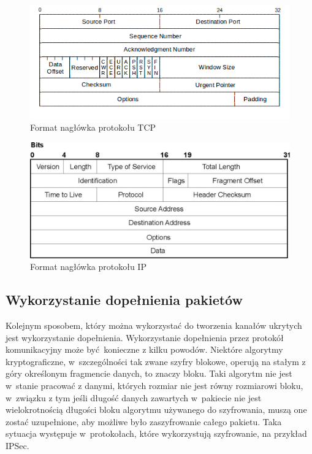 \documentclass[a4paper, twoside, 12pt]{report}
\begin{document}
        \begin{figure}[h]
                \centering
                \includegraphics{tcp_header}
                \caption{Format nagłówka protokołu TCP}
                \label{TCPHEADER}
        \end{figure}
        \begin{figure}[h]
                \centering
                \includegraphics{ip_header}
                \caption{Format nagłówka protokołu IP}
                \label{IPHEADER}
        \end{figure}
        \subsection{Wykorzystanie dopełnienia pakietów}
        Kolejnym sposobem, który można wykorzystać do tworzenia kanałów ukrytych
        jest wykorzystanie dopełnienia. Wykorzystanie dopełnienia przez protokół komunikacyjny
        może być konieczne z kilku powodów. Niektóre algorytmy kryptograficzne, w~szczególności
        tak zwane szyfry blokowe, operują na stałym z góry określonym fragmencie danych,
        to znaczy bloku. Taki algorytm nie jest w~stanie pracować z danymi, których
        rozmiar nie jest równy rozmiarowi bloku, w~związku z tym jeśli długość
        danych zawartych w~pakiecie nie jest wielokrotnością długości bloku
        algorytmu używanego do szyfrowania, muszą one zostać uzupełnione, aby możliwe
        było zaszyfrowanie całego pakietu. Taka sytuacja występuje w~protokołach,
        które wykorzystują szyfrowanie, na przykład IPSec\cite{IPSECPADDING}.
\end{document}
